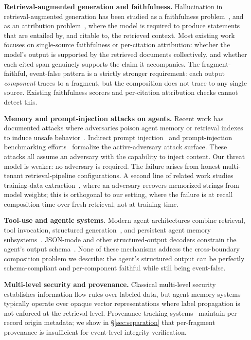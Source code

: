 \documentclass[conference,compsoc]{IEEEtran}
\begin{document}
\textbf{Retrieval-augmented generation and faithfulness.}
Hallucination in retrieval-augmented generation has been studied as a faithfulness problem~\cite{lewis2020rag,shi2024faithfulness,gao2023rag-survey}, and as an attribution problem~\cite{rashkin2023attribution,gao2023alce}, where the model is required to produce statements that are entailed by, and citable to, the retrieved context. Most existing work focuses on single-source faithfulness or per-citation attribution: whether the model's output is supported by the retrieved documents collectively, and whether each cited span genuinely supports the claim it accompanies. The fragment-faithful, event-false pattern is a strictly stronger requirement: each output \emph{component} traces to a fragment, but the composition does not trace to any single source. Existing faithfulness scorers and per-citation attribution checks cannot detect this.

\textbf{Memory and prompt-injection attacks on agents.}
Recent work has documented attacks where adversaries poison agent memory or retrieval indexes to induce unsafe behavior~\cite{chen2024agentpoison,dong2025minja,zou2025poisonedrag}. Indirect prompt injection~\cite{greshake2023indirect,perez2022ignore} and prompt-injection benchmarking efforts~\cite{liu2024formalizing} formalize the active-adversary attack surface. These attacks all assume an adversary with the capability to inject content. Our threat model is weaker: no adversary is required. The failure arises from honest multi-tenant retrieval-pipeline configurations. A second line of related work studies training-data extraction~\cite{carlini2021extracting}, where an adversary recovers memorized strings from model weights; this is orthogonal to our setting, where the failure is at recall composition time over fresh retrieval, not at training time.

\textbf{Tool-use and agentic systems.}
Modern agent architectures combine retrieval, tool invocation, structured generation~\cite{schick2023toolformer,yao2023react}, and persistent agent memory subsystems~\cite{packer2023memgpt}. JSON-mode and other structured-output decoders constrain the agent's output schema~\cite{willard2023efficient}. None of these mechanisms address the cross-boundary composition problem we describe: the agent's structured output can be perfectly schema-compliant and per-component faithful while still being event-false.

\textbf{Multi-level security and provenance.}
Classical multi-level security~\cite{bell1973secure,biba1977integrity} establishes information-flow rules over labeled data, but agent-memory systems typically operate over opaque vector representations where label propagation is not enforced at the retrieval level. Provenance tracking systems~\cite{pasquier2018provenance} maintain per-record origin metadata; we show in \S\ref{sec:separation} that per-fragment provenance is insufficient for event-level integrity verification.
\end{document}
